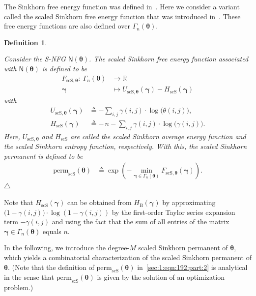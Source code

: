 \documentclass[journal,lettersize,twocolumn]{IEEEtran} %
\newtheorem{definition}[theorem]{Definition}
\newcommand{\edefinition}{\hfill$\triangle$}
\newcommand{\vect}[1]{ \bm{#1} }
\newcommand{\vgam}{ \vect{\gamma} }
\newcommand{\sfN}{ \mathsf{N} }
\newcommand{\sR}{\mathbb{R}}
\newcommand{\matr}[1]{ \bm{#1} }
\newcommand{\defeq}{ \triangleq }
\newcommand{\permscs}{ \mathrm{perm}_{\mathrm{scS}} }
\newcommand{\mtheta}{\matr{\theta}}
\newcommand{\vtheta}{\matr{\theta}}
\newcommand{\HBthe}{H_{ \mathrm{B} }}
\newcommand{\FscSthe}{F_{ \mathrm{scS}, \mtheta }}
\newcommand{\UscSthe}{U_{ \mathrm{scS}, \mtheta }}
\newcommand{\HscSthe}{H_{ \mathrm{scS} }}
\newcommand{\Gamnthe}{ \Gamma_{n}(\vtheta) }
\begin{document}
%

The Sinkhorn free energy function was defined in~\cite{Vontobel2014}. Here we
consider a variant called the scaled Sinkhorn free energy function that was
introduced in~\cite{N.Anari2021}. These free energy functions are also defined
over $\Gamma_{n}(\mtheta)$.

%

\begin{definition} 
  \label{sec:1:def:20}

  Consider the S-NFG $ \sfN(\mtheta) $. The scaled Sinkhorn free energy
  function associated with $ \sfN(\mtheta) $ is defined to be
  \begin{align*}
    \FscSthe: \ \Gamma_{n}(\vtheta) &\to \sR \\
                \vgam          &\mapsto \UscSthe( \vgam ) - \HscSthe( \vgam )
  \end{align*}
  with
  \begin{align*}
    \UscSthe(\vgam) 
      &\defeq
         - 
         \sum_{ i,j }
           \gamma(i,j) \cdot \log\bigl( \theta(i,j) \bigr), \\
    \HscSthe(\vgam)
      &\defeq 
         - \,
         n
         -
         \sum_{ i,j }
           \gamma(i,j) \cdot 
             \log\bigl( \gamma(i,j) \bigr).
    \end{align*}
    Here, $ \UscSthe $ and $ \HscSthe $ are called the scaled Sinkhorn average
    energy function and the scaled Sinkhorn entropy function,
    respectively. With this, the scaled Sinkhorn permanent is defined to be
    \begin{align}
      \permscs(\mtheta)
        &\defeq 
           \exp
             \left(
               - \min_{\vgam \in \Gamnthe} \FscSthe( \vgam ) 
             \right).
          \label{sec:1:eqn:192:part:2}
    \end{align}
    \edefinition
\end{definition}

%

Note that $\HscSthe(\vgam)$ can be obtained from $\HBthe( \vgam )$ by
approximating $\bigl( 1 - \gamma(i,j) \bigr) \cdot \log( 1 - \gamma(i,j) )$ by
the first-order Taylor series expansion term $- \gamma(i,j)$ and using the
fact that the sum of all entries of the matrix
$ \vgam \in \Gamma_{n}(\vtheta) $ equals $n$.

%

In the following, we introduce the degree-$M$ scaled Sinkhorn permanent of
$\mtheta$, which yields a combinatorial characterization of the scaled
Sinkhorn permanent of $\mtheta$. (Note that the definition of
$\permscs(\mtheta)$ in~\eqref{sec:1:eqn:192:part:2} is analytical in the sense
that $\permscs(\mtheta)$ is given by the solution of an optimization problem.)
\end{document}
